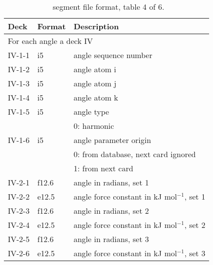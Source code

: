 \begin{table}
\begin{center}
\begin{tabular*}{150mm}{p{15mm}p{12mm}l}
\hline\hline
Deck & Format & Description \\ \hline
\multicolumn{3}{l}{For each angle a deck IV} \\
IV-1-1 & i5     & angle sequence number \\
IV-1-2 & i5     & angle atom i \\
IV-1-3 & i5     & angle atom j \\
IV-1-4 & i5     & angle atom k \\
IV-1-5 & i5     & angle type \\
       &        & 0: harmonic\\
IV-1-6 & i5     & angle parameter origin\\
       &        & 0: from database, next card ignored \\
       &        & 1: from next card\\
IV-2-1 & f12.6  & angle in radians, set 1\\
IV-2-2 & e12.5  & angle force constant in kJ mol$^{-1}$, set 1 \\
IV-2-3 & f12.6  & angle in radians, set 2\\
IV-2-4 & e12.5  & angle force constant in kJ mol$^{-1}$, set 2 \\
IV-2-5 & f12.6  & angle in radians, set 3\\
IV-2-6 & e12.5  & angle force constant in kJ mol$^{-1}$, set 3 \\
\hline
\end{tabular*}
\caption{\nwargos\ segment file format, table 4 of 6.\label{tbl:nwaseg4}}
\end{center}
\end{table}

